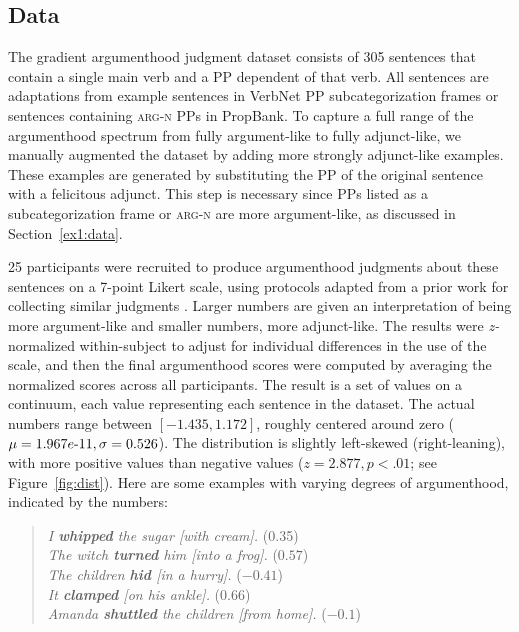 \documentclass[letterpaper]{article} %
\begin{document}
\subsection{Data}
The gradient argumenthood judgment dataset consists of 305 sentences that contain a single main verb and a PP dependent of that verb. All sentences are adaptations from example sentences in VerbNet PP subcategorization frames or sentences containing \textsc{arg-n} PPs in PropBank. To capture a full range of the argumenthood spectrum from fully argument-like to fully adjunct-like, we manually augmented the dataset by adding more strongly adjunct-like examples. These examples are generated by substituting the PP of the original sentence with a felicitous adjunct. This step is necessary since PPs listed as a subcategorization frame or \textsc{arg-n} are more argument-like, as discussed in Section~\ref{ex1:data}. 

25 participants were recruited to produce argumenthood judgments about these sentences on a 7-point Likert scale, using protocols adapted from a prior work for collecting similar judgments \cite{rissman2015using}. Larger numbers are given an interpretation of being more argument-like and smaller numbers, more adjunct-like. The results were \textit{z-}normalized within-subject to adjust for individual differences in the use of the scale, and then the final argumenthood scores were computed by averaging the normalized scores across all participants. The result is a set of values on a continuum, each value representing each sentence in the dataset. The actual numbers range between $[-1.435, 1.172]$, roughly centered around zero ($\mu=1.967e\textnormal{-}11, \sigma=0.526$). The distribution is slightly left-skewed (right-leaning), with more positive values than negative values ($z=2.877, p<.01$; see Figure~\ref{fig:dist}). Here are some examples with varying degrees of argumenthood, indicated by the numbers:

\begin{quote}
	\textit{I \textbf{whipped} the sugar [with cream].} (0.35)\\
	\hspace{-0.5cm}\textit{The witch \textbf{turned} him [into a frog].} ($0.57$) \\
	\hspace{-0.5cm}\textit{The children \textbf{hid} [in a hurry].} ($-0.41$) \\
	\hspace{-0.5cm}\textit{It \textbf{clamped} [on his ankle].} ($0.66$) \\
	\hspace{-0.5cm}\textit{Amanda \textbf{shuttled} the children [from home].} ($-0.1$)
\end{quote}
\end{document}
